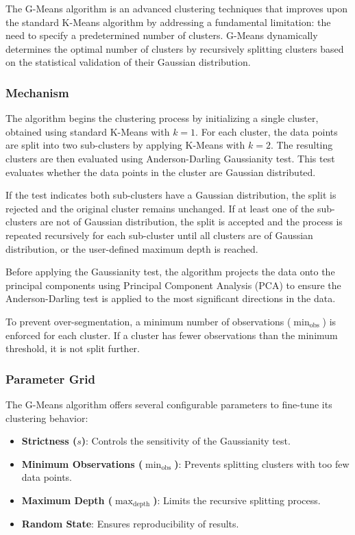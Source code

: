 The G-Means algorithm is an advanced clustering techniques that improves upon the standard K-Means algorithm by addressing
a fundamental limitation: the need to specify a predetermined number of clusters.
G-Means dynamically determines the optimal number of clusters by recursively splitting clusters based on the
statistical validation of their Gaussian distribution.

\subsubsection*{Mechanism}

The algorithm begins the clustering process by initializing a single cluster, obtained using standard K-Means with \(k=1\).
For each cluster, the data points are split into two sub-clusters by applying K-Means with \(k=2\).
The resulting clusters are then evaluated using Anderson-Darling Gaussianity test. This test evaluates whether the data points in the cluster
are Gaussian distributed.

If the test indicates both sub-clusters have a Gaussian distribution, the split is rejected and the original cluster remains unchanged.
If at least one of the sub-clusters are not of Gaussian distribution, the split is accepted and the process is repeated recursively for each sub-cluster
until all clusters are of Gaussian distribution, or the user-defined maximum depth is reached.

Before applying the Gaussianity test, the algorithm projects the data onto the principal components using Principal Component
Analysis (PCA) to ensure the Anderson-Darling test is applied to the most significant directions in the data.

To prevent over-segmentation, a minimum number of observations (\(\min_{\text{obs}}\)) is enforced for each cluster.
If a cluster has fewer observations than the minimum threshold, it is not split further.

\subsubsection*{Parameter Grid}

The G-Means algorithm offers several configurable parameters to fine-tune its clustering behavior:

\begin{itemize}
    \item \textbf{Strictness ($s$)}: Controls the sensitivity of the Gaussianity test.
    \item \textbf{Minimum Observations ($\min_{\text{obs}}$)}: Prevents splitting clusters with too few data points.
    \item \textbf{Maximum Depth ($\max_{\text{depth}}$)}: Limits the recursive splitting process.
    \item \textbf{Random State}: Ensures reproducibility of results.
\end{itemize}

